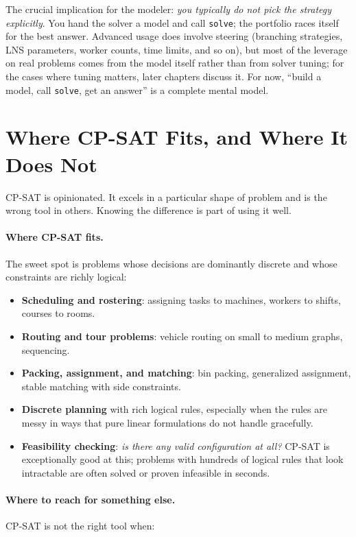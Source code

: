 The crucial implication for the modeler: \emph{you typically do not pick
the strategy explicitly}. You hand the solver a model and call
\lstinline!solve!; the portfolio races itself for the best
answer. Advanced usage does involve steering (branching strategies,
LNS parameters, worker counts, time limits, and so on), but most of
the leverage on real problems comes from the model itself rather than
from solver tuning; for the cases where tuning matters, later chapters
discuss it. For now, ``build a model, call
\lstinline!solve!, get an answer'' is a complete mental
model.

\section{Where CP-SAT Fits, and Where It Does Not}\label{sec:5.2}

CP-SAT is opinionated. It excels in a particular shape of problem and is
the wrong tool in others. Knowing the difference is part of using it
well.

\paragraph{Where CP-SAT fits.} The sweet spot is problems whose decisions
are dominantly discrete and whose constraints are richly logical:

\begin{itemize}
\item
  \textbf{Scheduling and rostering}: assigning tasks to machines,
  workers to shifts, courses to rooms.
\item
  \textbf{Routing and tour problems}: vehicle routing on small to
  medium graphs, sequencing.
\item
  \textbf{Packing, assignment, and matching}: bin packing,
  generalized assignment, stable matching with side constraints.
\item
  \textbf{Discrete planning} with rich logical rules, especially when
  the rules are messy in ways that pure linear formulations do not
  handle gracefully.
\item
  \textbf{Feasibility checking}: \emph{is there any valid
  configuration at all?} CP-SAT is exceptionally good at this; problems
  with hundreds of logical rules that look intractable are often solved
  or proven infeasible in seconds.
\end{itemize}

\paragraph{Where to reach for something else.} CP-SAT is not the right tool
when:


